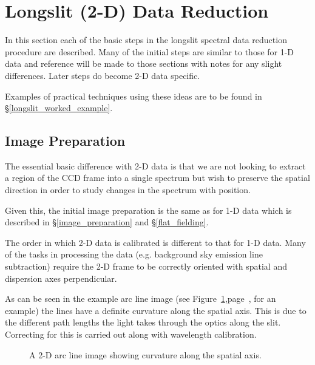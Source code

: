 \documentclass[twoside,11pt]{article}
\newcommand{\stardocinitials}  {SC}
\newcommand{\stardocnumber}    {7.2}
\newcommand{\stardocname}{\stardocinitials /\stardocnumber}
\newcommand{\htmlref}[2]{#1}
\newcommand{\xlabel}[1]{}
\newcommand{\mlabel}[1]{\xlabel{#1}\label{#1}}
\newcommand{\scspec}[2]{#1}
\newcommand{\scspec}[2]{#2}
\begin{document}
\section{\mlabel{longslit_reduction_steps}Longslit (2-D) Data Reduction}
\markboth{Longslit Reduction Steps}{\stardocname}

In this section each of the basic steps in the longslit spectral data reduction
procedure are described. Many of the initial steps are similar to those
for 1-D data and reference will be made to those sections with notes
for any slight differences. Later steps do become 2-D data specific.

Examples of practical techniques using these ideas are to be found
in \scspec{\S\ref{longslit_worked_example}}
{\htmlref{A 2-D Worked Example}{longslit_worked_example}}.


\subsection{\mlabel{image_long_preparation}Image Preparation}

The essential basic difference with 2-D data is that we are not
looking to extract a region of the CCD frame into a single spectrum
but wish to preserve the spatial direction in order to study changes
in the spectrum with position.

Given this, the initial image preparation is the same as for 1-D data
which is described in \scspec{\S\ref{image_preparation}}
{\htmlref{{\sl Image Preparation}}{image_preparation}} and
 \scspec{\S\ref{flat_fielding}}
{\htmlref{Flat Fielding}{flat_fielding}}.



The order in which 2-D data is calibrated is different to that for 1-D
data. Many of the tasks in processing the data (e.g. background sky
emission line subtraction) require the 2-D frame to be correctly
oriented with spatial and dispersion axes perpendicular.

As can be seen in the example arc line image (see
\scspec{Figure~\ref{arc_line_curve},page~\pageref{arc_line_curve},}{the
figure below} for an example) the
lines have a definite curvature along the spatial axis. This is due to
the different path lengths the light takes through the optics along
the slit. Correcting for this is carried out along with wavelength
calibration.

\begin{figure}
\begin{center}
  \scspec{\leavevmode\epsfysize=105mm\epsfbox{sc7_13.eps}}
         {\leavevmode\epsfysize=136mm}

  \parbox{140mm}{
    \caption{A 2-D arc line image showing curvature along the spatial axis.}
    \label{arc_line_curve}
  }
\end{center}
\end{figure}
\end{document}
